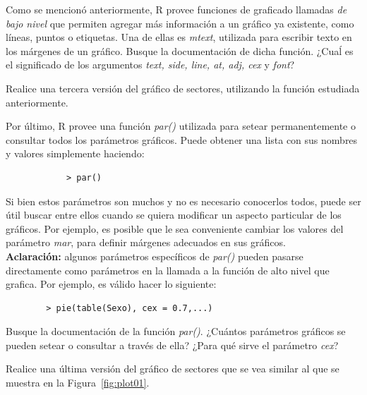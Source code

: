 \documentclass{prob}
\begin{document}
\begin{problema}
	\begin{parte}
		Como se mencionó anteriormente, R provee funciones de graficado llamadas \textit{de bajo nivel} que permiten agregar más información a un gráfico ya existente, como líneas, puntos o etiquetas. Una de ellas es \textit{mtext}, utilizada para escribir texto en los márgenes de un gráfico. Busque la documentación de dicha función. ¿Cuaĺ es el significado de los argumentos \textit{text, side, line, at, adj, cex} y \textit{font}? 
	\end{parte}
	
	\begin{parte}
		Realice una tercera versión del gráfico de sectores, utilizando la función estudiada anteriormente.
	\end{parte}
	
	\begin{parte}
		Por último, R provee una función \textit{par()} utilizada para setear permanentemente o consultar todos los parámetros gráficos. Puede obtener una lista con sus nombres y valores simplemente haciendo:
		\begin{verbatim}
		    > par()
		\end{verbatim}
	Si bien estos parámetros son muchos y no es necesario conocerlos todos, puede ser útil buscar entre ellos cuando se quiera modificar un aspecto particular de los gráficos. Por ejemplo, es posible que le sea conveniente cambiar los valores del parámetro \textit{mar}, para definir márgenes adecuados en sus gráficos. \\
	
	\textbf{Aclaración:} algunos parámetros específicos de \textit{par()} pueden pasarse directamente como parámetros en la llamada a la función de alto nivel que grafica. Por ejemplo, es válido hacer lo siguiente:
	\begin{verbatim}
	    > pie(table(Sexo), cex = 0.7,...)
	\end{verbatim}
\medskip	
	Busque la documentación de la función \textit{par()}. ¿Cuántos parámetros gráficos se pueden setear o consultar a través de ella? ¿Para qué sirve el parámetro \textit{cex}?
	\end{parte}
		
	\begin{parte}	
	Realice una última versión del gráfico de sectores que se vea similar al que se muestra en la Figura~\ref{fig:plot01}.
	\end{parte}

	\end{problema}
	
\end{document}
